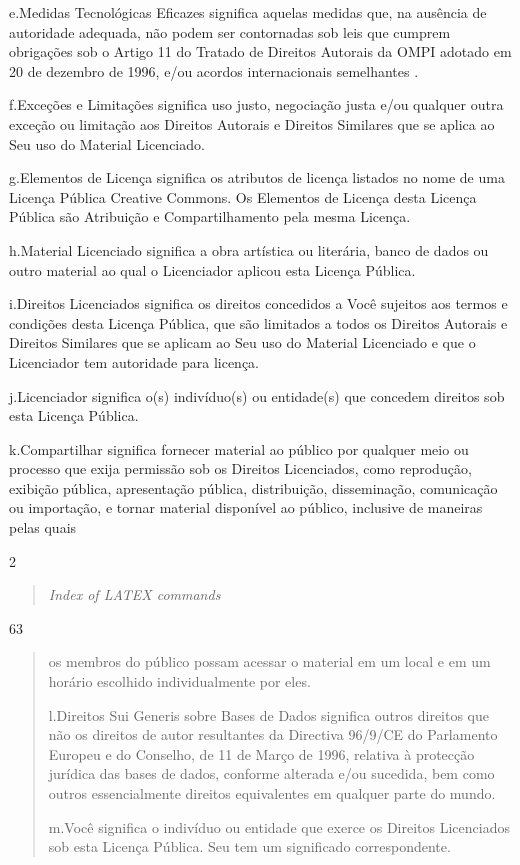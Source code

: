 \documentclass[
]{article}
\begin{document}
e.Medidas Tecnológicas Eficazes significa aquelas medidas que, na
ausência de autoridade adequada, não podem ser contornadas sob leis que
cumprem obrigações sob o Artigo 11 do Tratado de Direitos Autorais da
OMPI adotado em 20 de dezembro de 1996, e/ou acordos internacionais
semelhantes .

f.Exceções e Limitações significa uso justo, negociação justa e/ou
qualquer outra exceção ou limitação aos Direitos Autorais e Direitos
Similares que se aplica ao Seu uso do Material Licenciado.

g.Elementos de Licença significa os atributos de licença listados no
nome de uma Licença Pública Creative Commons. Os Elementos de Licença
desta Licença Pública são Atribuição e Compartilhamento pela mesma
Licença.

h.Material Licenciado significa a obra artística ou literária, banco de
dados ou outro material ao qual o Licenciador aplicou esta Licença
Pública.

i.Direitos Licenciados significa os direitos concedidos a Você sujeitos
aos termos e condições desta Licença Pública, que são limitados a todos
os Direitos Autorais e Direitos Similares que se aplicam ao Seu uso do
Material Licenciado e que o Licenciador tem autoridade para licença.

j.Licenciador significa o(s) indivíduo(s) ou entidade(s) que concedem
direitos sob esta Licença Pública.

k.Compartilhar significa fornecer material ao público por qualquer meio
ou processo que exija permissão sob os Direitos Licenciados, como
reprodução, exibição pública, apresentação pública, distribuição,
disseminação, comunicação ou importação, e tornar material disponível ao
público, inclusive de maneiras pelas quais

2

\begin{quote}
\emph{Index of LATEX commands}
\end{quote}

63

\begin{quote}
os membros do público possam acessar o material em um local e em um
horário escolhido individualmente por eles.

l.Direitos Sui Generis sobre Bases de Dados significa outros direitos
que não os direitos de autor resultantes da Directiva 96/9/CE do
Parlamento Europeu e do Conselho, de 11 de Março de 1996, relativa à
protecção jurídica das bases de dados, conforme alterada e/ou sucedida,
bem como outros essencialmente direitos equivalentes em qualquer parte
do mundo.

m.Você significa o indivíduo ou entidade que exerce os Direitos
Licenciados sob esta Licença Pública. Seu tem um significado
correspondente.
\end{quote}
\end{document}

